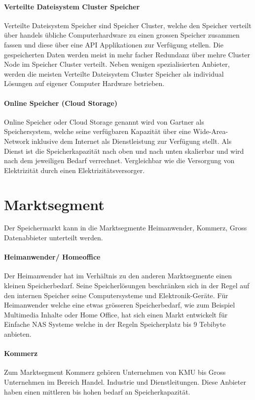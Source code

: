 \paragraph*{Verteilte Dateisystem Cluster Speicher}
Verteilte Dateisystem Speicher sind Speicher Cluster, welche den Speicher verteilt über handels übliche Computerhardware zu einen grossen Speicher zusammen fassen und diese über eine API Applikationen zur Verfügung stellen. Die gespeicherten Daten werden meist in mehr facher Redundanz über mehre Cluster Node im Speicher Cluster verteilt. Neben wenigen spezialisierten Anbieter, werden die meisten Verteilte Dateisystem Cluster Speicher als individual Lösungen auf eigener Computer Hardware betrieben.

\paragraph*{Online Speicher (Cloud Storage)}
Online Speicher oder Cloud Storage genannt wird von Gartner als Speichersystem, welche seine verfügbaren Kapazität über eine Wide-Area-Network inklusive dem Internet als Dienstleistung zur Verfügung stellt. Als Dienst ist die Speicherkapazität nach oben und nach unten skalierbar und wird nach dem jeweiligen Bedarf verrechnet. Vergleichbar wie die Versorgung von Elektrizität durch einen Elektrizitätsversorger.\cite{AdamW.Couture2010}

\section{Marktsegment}
Der Speichermarkt kann in die Marktsegmente Heimanwender, Kommerz, Gross Datenabbieter unterteilt werden.

\paragraph*{Heimanwender/ Homeoffice} 
Der Heimanwender hat im Verhältnis zu den anderen Marktsegmente einen kleinen Speicherbedarf. Seine Speicherlösungen beschränken sich in der Regel auf den internen Speicher seine Computersysteme und Elektronik-Geräte. Für Heimanwender welche eine etwas grösseren Speicherbedarf, wie zum Beispiel Multimedia Inhalte oder Home Office, hat sich einen Markt entwickelt für Einfache NAS Systeme welche in der Regeln Speicherplatz bis 9 Tebibyte anbieten.


\paragraph*{Kommerz}
Zum Marktsegment Kommerz gehören Unternehmen von KMU bis Gross Unternehmen im Bereich Handel. Industrie und Dienstleitungen. Diese Anbieter haben einen mittleren bis hohen bedarf an Speicherkapazität. 

